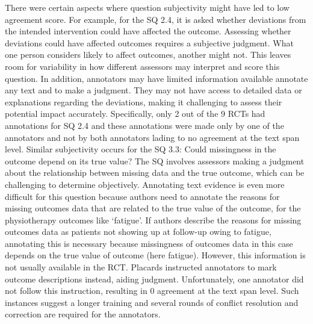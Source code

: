 \documentclass[sn-mathphys,Numbered]{sn-jnl}%
\theoremstyle{thmstyleone}%
\theoremstyle{thmstyletwo}%
\theoremstyle{thmstylethree}%
\begin{document}
There were certain aspects where question subjectivity might have led to low agreement score.
For example, for the SQ 2.4, it is asked whether deviations from the intended intervention could have affected the outcome.
Assessing whether deviations could have affected outcomes requires a subjective judgment.
What one person considers likely to affect outcomes, another might not.
This leaves room for variability in how different assessors may interpret and score this question.
In addition, annotators may have limited information available annotate any text and to make a judgment.
They may not have access to detailed data or explanations regarding the deviations, making it challenging to assess their potential impact accurately.
Specifically, only 2 out of the 9 RCTs had annotations for SQ 2.4 and these annotations were made only by one of the annotators and not by both annotators lading to no agreement at the text span level.
Similar subjectivity occurs for the SQ 3.3: Could missingness in the outcome depend on its true value?
The SQ involves assessors making a judgment about the relationship between missing data and the true outcome, which can be challenging to determine objectively.
Annotating text evidence is even more difficult for this question because authors need to annotate the reasons for missing outcomes data that are related to the true value of the outcome, for the physiotherapy outcomes like `fatigue'.
If authors describe the reasons for missing outcomes data as patients not showing up at follow-up owing to fatigue, annotating this is necessary because missingness of outcomes data in this case depends on the true value of outcome (here fatigue).
However, this information is not usually available in the RCT.
Placards instructed annotators to mark outcome descriptions instead, aiding judgment.
Unfortunately, one annotator did not follow this instruction, resulting in 0 agreement at the text span level.
Such instances suggest a longer training and several rounds of conflict resolution and correction are required for the annotators.
%
%
%
\end{document}
